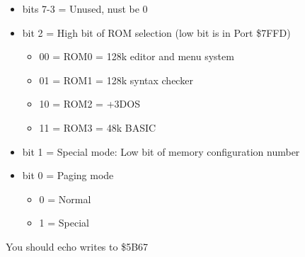 \begin{itemize}
\item[] bits 7-3 = Unused, nust be 0
\item[] bit 2 = High bit of ROM selection (low bit is in Port \$7FFD)
  \begin{itemize}
  \item[] 00 = ROM0 = 128k editor and menu system
  \item[] 01 = ROM1 = 128k syntax checker
  \item[] 10 = ROM2 = +3DOS
  \item[] 11 = ROM3 = 48k BASIC
  \end{itemize}
\item[] bit 1 = Special mode: Low bit of memory configuration number
\item[] bit 0 = Paging mode
  \begin{itemize}
  \item[] 0 = Normal
  \item[] 1 = Special
  \end{itemize}
\end{itemize}
You should echo writes to \$5B67

